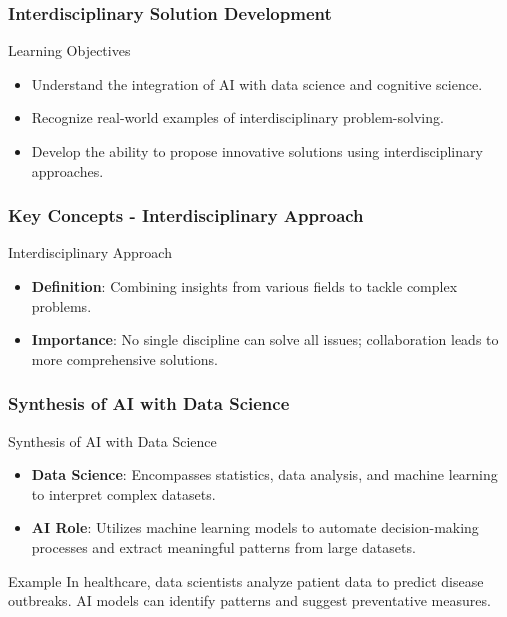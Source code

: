 \documentclass[aspectratio=169]{beamer}
\begin{document}
\begin{frame}[fragile]
    \frametitle{Interdisciplinary Solution Development}
    \begin{block}{Learning Objectives}
        \begin{itemize}
            \item Understand the integration of AI with data science and cognitive science.
            \item Recognize real-world examples of interdisciplinary problem-solving.
            \item Develop the ability to propose innovative solutions using interdisciplinary approaches.
        \end{itemize}
    \end{block}
\end{frame}

\begin{frame}[fragile]
    \frametitle{Key Concepts - Interdisciplinary Approach}
    \begin{block}{Interdisciplinary Approach}
        \begin{itemize}
            \item \textbf{Definition}: Combining insights from various fields to tackle complex problems.
            \item \textbf{Importance}: No single discipline can solve all issues; collaboration leads to more comprehensive solutions.
        \end{itemize}
    \end{block}
\end{frame}

\begin{frame}[fragile]
    \frametitle{Synthesis of AI with Data Science}
    \begin{block}{Synthesis of AI with Data Science}
        \begin{itemize}
            \item \textbf{Data Science}: Encompasses statistics, data analysis, and machine learning to interpret complex datasets.
            \item \textbf{AI Role}: Utilizes machine learning models to automate decision-making processes and extract meaningful patterns from large datasets.
        \end{itemize}
        
        \begin{exampleblock}{Example}
            In healthcare, data scientists analyze patient data to predict disease outbreaks. AI models can identify patterns and suggest preventative measures.
        \end{exampleblock}
    \end{block}
\end{frame}
\end{document}
